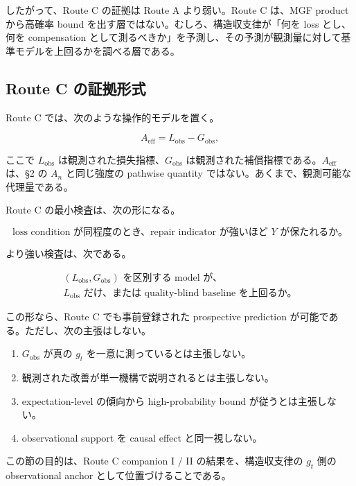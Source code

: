 \documentclass[12pt,a4paper]{article}
\begin{document}
したがって、Route C の証拠は Route A より弱い。Route C は、MGF product から高確率 bound を出す層ではない。むしろ、構造収支律が「何を loss とし、何を compensation として測るべきか」を予測し、その予測が観測量に対して基準モデルを上回るかを調べる層である。

\subsection{Route C の証拠形式}\label{route-c-ux306eux8a3cux62e0ux5f62ux5f0f}

Route C では、次のような操作的モデルを置く。

\[
A_{\mathrm{eff}} = L_{\mathrm{obs}} - G_{\mathrm{obs}},
\]

ここで \(L_{\mathrm{obs}}\) は観測された損失指標、\(G_{\mathrm{obs}}\) は観測された補償指標である。\(A_{\mathrm{eff}}\) は、§2 の \(A_{n}\) と同じ強度の pathwise quantity ではない。あくまで、観測可能な代理量である。

Route C の最小検査は、次の形になる。

\[
\text{loss condition が同程度のとき、repair indicator が強いほど }Y\text{ が保たれるか。}
\]

より強い検査は、次である。

\[
\begin{aligned}
(L_{\mathrm{obs}},G_{\mathrm{obs}})\text{ を区別する model が、} \\
L_{\mathrm{obs}}\text{ だけ、または quality-blind baseline を上回るか。}
\end{aligned}
\]

この形なら、Route C でも事前登録された prospective prediction が可能である。ただし、次の主張はしない。

\begin{enumerate}
\def\labelenumi{\arabic{enumi}.}
\tightlist
\item
  \(G_{\mathrm{obs}}\) が真の \(g_{t}\) を一意に測っているとは主張しない。
\item
  観測された改善が単一機構で説明されるとは主張しない。
\item
  expectation-level の傾向から high-probability bound が従うとは主張しない。
\item
  observational support を causal effect と同一視しない。
\end{enumerate}

この節の目的は、Route C companion I / II の結果を、構造収支律の \(g_{t}\) 側の observational anchor として位置づけることである。
\end{document}
